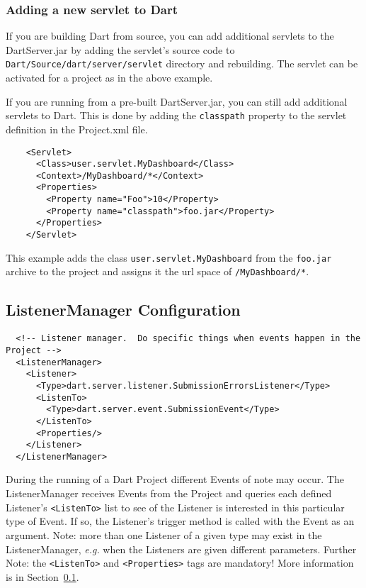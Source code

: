 \documentclass{InsightBook}
\newcommand{\xmltag}[1]{\texttt{<#1>}}
\newcommand{\filename}[1]{\texttt{#1}}
\begin{document}
\subsubsection{Adding a new servlet to Dart}
\label{Sec:UserServlet}

If you are building Dart from source, you can add additional servlets 
to the DartServer.jar by adding the servlet's source code to 
\filename{Dart/Source/dart/server/servlet} directory and rebuilding.  The
servlet can be activated for a project as in the above example.

If you are running from a pre-built DartServer.jar, you can still add
additional servlets to Dart. This is done by adding the \texttt{classpath} 
property to the servlet definition in the Project.xml file.
\begin{verbatim}
    <Servlet>
      <Class>user.servlet.MyDashboard</Class>
      <Context>/MyDashboard/*</Context>
      <Properties>
        <Property name="Foo">10</Property>
        <Property name="classpath">foo.jar</Property>
      </Properties>
    </Servlet>
\end{verbatim}

This example adds the class \texttt{user.servlet.MyDashboard} from the \filename{foo.jar} 
archive to the project and assigns it the url space of \texttt{/MyDashboard/*}.

\subsection{ListenerManager Configuration}
\label{Section:ListenerManager}
\begin{verbatim}
  <!-- Listener manager.  Do specific things when events happen in the Project -->
  <ListenerManager>
    <Listener>
      <Type>dart.server.listener.SubmissionErrorsListener</Type>
      <ListenTo>
        <Type>dart.server.event.SubmissionEvent</Type>
      </ListenTo>
      <Properties/>
    </Listener>
  </ListenerManager>
\end{verbatim}

During the running of a Dart Project different Events of note may
occur.  The ListenerManager receives Events from the Project and
queries each defined Listener's \xmltag{ListenTo} list to see of the
Listener is interested in this particular type of Event.  If so, the
Listener's trigger method is called with the Event as an argument.
Note: more than one Listener of a given type may exist in the
ListenerManager, \emph{e.g.} when the Listeners are given different
parameters.  Further Note: the \xmltag{ListenTo} and
\xmltag{Properties} tags are mandatory!  More information is in
Section~\ref{Section:ListenerManager}. 
\end{document}

